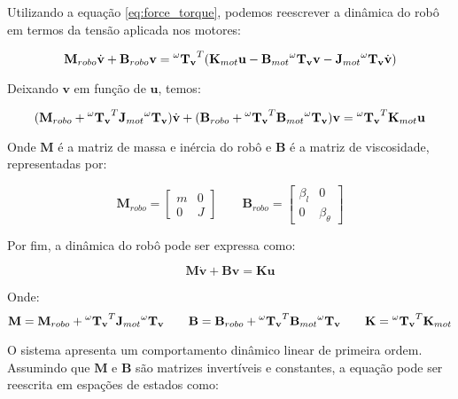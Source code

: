 Utilizando a equação \ref{eq:force_torque}, 
podemos reescrever a dinâmica do robô em 
termos da tensão aplicada nos motores:

\begin{equation}
\mathbf{M}_{robo} \dot{\mathbf{v}} + \mathbf{B}_{robo} \mathbf{v} = 
\mathbf{\prescript{\omega}{}{T_v}}^T (\mathbf{K}_{mot} \mathbf{u} - \mathbf{B}_{mot} \mathbf{\prescript{\omega}{}{T_v}} \mathbf{v} - \mathbf{J}_{mot} \mathbf{\prescript{\omega}{}{T_v}} \dot{\mathbf{v}})
\end{equation}

Deixando $\mathbf{v}$ em função de $\mathbf{u}$, temos:

\begin{equation}
(\mathbf{M}_{robo} + \mathbf{\prescript{\omega}{}{T_v}}^T \mathbf{J}_{mot} \mathbf{\prescript{\omega}{}{T_v}}) \dot{\mathbf{v}}
+
(\mathbf{B}_{robo} + \mathbf{\prescript{\omega}{}{T_v}}^T \mathbf{B}_{mot} \mathbf{\prescript{\omega}{}{T_v}}) \mathbf{v}
=
\mathbf{\prescript{\omega}{}{T_v}}^T \mathbf{K}_{mot} \mathbf{u}
\end{equation}

Onde $\mathbf{M}$ é a matriz de massa e inércia do robô e 
$\mathbf{B}$ é a matriz de viscosidade, representadas por:

\[
\mathbf{M}_{robo} =
\begin{bmatrix}
m & 0 \\
0 & J
\end{bmatrix}
\qquad
\mathbf{B}_{robo} =
\begin{bmatrix}
\beta_l & 0 \\
0 & \beta_{\theta}
\end{bmatrix}
\]

Por fim, a dinâmica do robô pode ser expressa como:

\begin{equation}
\mathbf{M} \dot{\mathbf{v}} + \mathbf{B} \mathbf{v} = \mathbf{K} \mathbf{u}
\label{eq:robot_dynamics}
\end{equation}

Onde:
\[
\mathbf{M} = \mathbf{M}_{robo} + \mathbf{\prescript{\omega}{}{T_v}}^T \mathbf{J}_{mot} \mathbf{\prescript{\omega}{}{T_v}}
\qquad
\mathbf{B} = \mathbf{B}_{robo} + \mathbf{\prescript{\omega}{}{T_v}}^T \mathbf{B}_{mot} \mathbf{\prescript{\omega}{}{T_v}}
\qquad
\mathbf{K} = \mathbf{\prescript{\omega}{}{T_v}}^T \mathbf{K}_{mot}
\]

O sistema apresenta um comportamento dinâmico linear de 
primeira ordem. Assumindo que $\mathbf{M}$ 
e $\mathbf{B}$ são matrizes invertíveis e constantes, 
a equação pode ser reescrita em espações de estados como:

